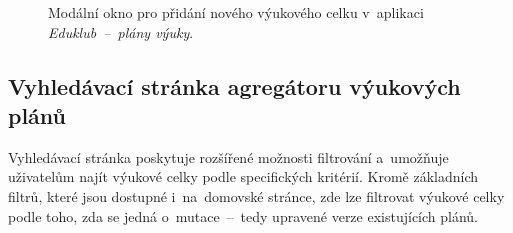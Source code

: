 \documentclass[male,czech,api_bc]{kitheses}
\begin{document}
\begin{figure}[H]
	\centering
	\caption{Modální okno pro přidání nového výukového celku v~aplikaci \textit{Eduklub~--~plány výuky}.}
	\label{fig:eduklub-2}
\end{figure}

\subsection{Vyhledávací stránka agregátoru výukových plánů}

Vyhledávací stránka poskytuje rozšířené možnosti filtrování a~umožňuje uživatelům najít výukové celky podle specifických kritérií. Kromě základních filtrů, které jsou dostupné i~na~domovské stránce, zde lze filtrovat výukové celky podle toho, zda se jedná o~mutace~--~tedy upravené verze existujících plánů.
\end{document}
